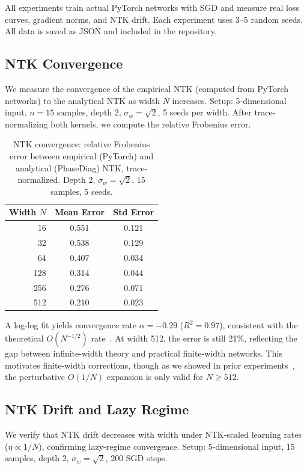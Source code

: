 \documentclass[10pt]{article}
\theoremstyle{definition}
\begin{document}
All experiments train actual PyTorch networks with SGD and measure real loss curves, gradient norms, and NTK drift.
Each experiment uses 3--5 random seeds.
All data is saved as JSON and included in the repository.

\subsection{NTK Convergence}
\label{sec:ntk-convergence}

We measure the convergence of the empirical NTK (computed from PyTorch networks) to the analytical NTK as width $N$ increases.
Setup: 5-dimensional input, $n = 15$ samples, depth 2, $\sigma_w = \sqrt{2}$, 5 seeds per width.
After trace-normalizing both kernels, we compute the relative Frobenius error.

\begin{table}[t]
\centering
\caption{NTK convergence: relative Frobenius error between empirical (PyTorch) and analytical (PhaseDiag) NTK, trace-normalized. Depth 2, $\sigma_w = \sqrt{2}$, 15 samples, 5 seeds.}
\label{tab:ntk-convergence}
\begin{tabular}{rcc}
\toprule
Width $N$ & Mean Error & Std Error \\
\midrule
16  & 0.551 & 0.121 \\
32  & 0.538 & 0.129 \\
64  & 0.407 & 0.034 \\
128 & 0.314 & 0.044 \\
256 & 0.276 & 0.071 \\
512 & 0.210 & 0.023 \\
\bottomrule
\end{tabular}
\end{table}

A log-log fit yields convergence rate $\alpha = -0.29$ ($R^2 = 0.97$), consistent with the theoretical $O(N^{-1/2})$ rate~\citep{jacot2018neural}.
At width 512, the error is still 21\%, reflecting the gap between infinite-width theory and practical finite-width networks.
This motivates finite-width corrections, though as we showed in prior experiments~\citep{dyer2020asymptotics}, the perturbative $O(1/N)$ expansion is only valid for $N \geq 512$.

\subsection{NTK Drift and Lazy Regime}
\label{sec:ntk-drift}

We verify that NTK drift decreases with width under NTK-scaled learning rates ($\eta \propto 1/N$), confirming lazy-regime convergence.
Setup: 5-dimensional input, 15 samples, depth 2, $\sigma_w = \sqrt{2}$, 200 SGD steps.
\end{document}
